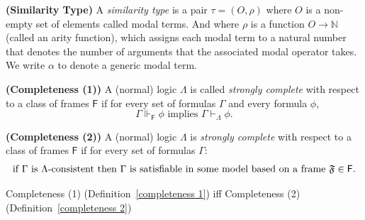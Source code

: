 \begin{definition}\label{similarity type}
    \textbf{(Similarity Type)} A \textit{similarity type} is a pair $\tau = (O, \rho)$ where $O$ is a non-empty set of elements called modal terms. And where $\rho$ is a function $O \rightarrow \mathbb{N}$ (called an arity function), which assigns each modal term to a natural number that denotes the number of arguments that the associated modal operator takes. We write $\alpha$ to denote a generic modal term.
\end{definition}

\begin{definition}\label{completeness 1}
    \textbf{(Completeness (1))} A (normal) logic $\Lambda$ is called \textit{strongly complete} with respect to a class of frames $\mathsf{F}$ if for every set of formulas $\Gamma$ and  every formula $\phi$,
    \begin{equation*}
        \Gamma \Vdash_\mathsf{F} \phi \text{ implies } \Gamma \vdash_{\Lambda} \phi.
    \end{equation*}
\end{definition}

\begin{definition} \label{completeness 2}
    \textbf{(Completeness (2))} A (normal) logic $\Lambda$ is \textit{strongly complete} with respect to a class of frames $\mathsf{F}$ if for every set of formulas $\Gamma$:
    \begin{equation*}
        \text{if }\Gamma \text{ is } \Lambda\text{-consistent} \text{ then }  \Gamma \text{ is satisfiable in some model based on a frame } \mathfrak{F}\in\mathsf{F}.
    \end{equation*}
\end{definition}

\begin{proposition}\label{completeness equivalence proposition}
    Completeness (1) (Definition~\ref{completeness 1}) iff Completeness (2) (Definition~\ref{completeness 2})
\end{proposition}